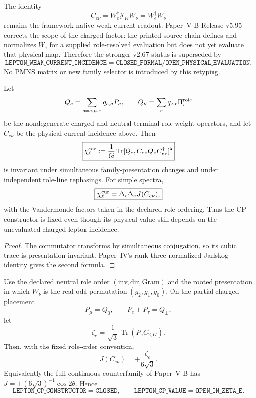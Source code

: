 \documentclass[12pt,a4paper]{article}
\begin{document}
\begin{corollary}
\label{p5c:cor:v274-lepton-current-formal-open}
The identity
\[
 C_{e\nu}=W_e^\dagger\mathscr J_WW_\nu=W_e^\dagger W_\nu
\]
remains the framework-native weak-current readout.  Paper~V-B Release v5.95
corrects the scope of the charged factor: the printed source chain defines
and normalizes $W_e$ for a supplied role-resolved evaluation but does not yet
evaluate that physical map.  Therefore the stronger v2.67 status is
superseded by
\[
 \boxed{
 \texttt{LEPTON\_WEAK\_CURRENT\_INCIDENCE}
 =\texttt{CLOSED\_FORMAL/OPEN\_PHYSICAL\_EVALUATION}.}
\]
No PMNS matrix or new family selector is introduced by this retyping.
\end{corollary}

\begin{theorem}
\label{p5c:thm:v274-native-lepton-cp-invariant}
Let
\[
 Q_e=\sum_{a=e,\mu,\tau}q_{e,a}P_a,
 \qquad
 Q_\nu=\sum_{r}q_{\nu,r}\Pi_r^{\rm role}
\]
be the nondegenerate charged and neutral terminal role-weight operators, and
let $C_{e\nu}$ be the physical current incidence above.  Then
\[
 \boxed{
 \chi_\ell^{\rm cur}:=\frac1{6i}\operatorname{Tr}
 [Q_e,C_{e\nu}Q_\nu C_{e\nu}^\dagger]^3}
\]
is invariant under simultaneous family-presentation changes and under
independent role-line rephasings.  For simple spectra,
\[
 \boxed{
 \chi_\ell^{\rm cur}=\Delta_e\Delta_\nu J(C_{e\nu}),}
\]
with the Vandermonde factors taken in the declared role ordering.  Thus the
CP constructor is fixed even though its physical value still depends on the
unevaluated charged-lepton incidence.
\end{theorem}

\begin{proof}
The commutator transforms by simultaneous conjugation, so its cubic trace is
presentation invariant.  Paper~IV's rank-three normalized Jarlskog identity
gives the second formula.
\end{proof}

\begin{corollary}
\label{p5c:cor:v274-zeta-jarlskog-reduction}
Use the declared neutral role order $(\mathrm{inv},\mathrm{dir},\mathrm{Gram})$
and the rooted presentation in which $W_\nu$ is the real odd permutation
$(g_2,g_1,g_0)$.  On the partial charged placement
\[
 P_\mu=Q_0,\qquad P_e+P_\tau=Q_\perp,
\]
let
\[
 \zeta_e=\frac1{\sqrt3}\operatorname{Tr}(P_eC_{2,G}).
\]
Then, with the fixed role-order convention,
\[
 \boxed{J(C_{e\nu})=+\frac{\zeta_e}{6\sqrt3}.}
\]
Equivalently the full continuous counterfamily of Paper~V-B has
$J=+(6\sqrt3)^{-1}\cos2\theta$.  Hence
\[
 \boxed{
 \texttt{LEPTON\_CP\_CONSTRUCTOR}=\texttt{CLOSED},\qquad
 \texttt{LEPTON\_CP\_VALUE}=\texttt{OPEN\_ON\_ZETA\_E}.}
\]
\end{corollary}
\end{document}
